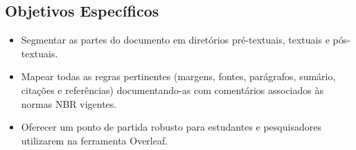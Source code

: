\subsection{Objetivos Específicos}
\begin{itemize}
  \item Segmentar as partes do documento em diretórios pré-textuais, textuais e pós-textuais.
  \item Mapear todas as regras pertinentes (margens, fontes, parágrafos, sumário, citações e referências) documentando-as com comentários associados às normas NBR vigentes.
  \item Oferecer um ponto de partida robusto para estudantes e pesquisadores utilizarem na ferramenta Overleaf.
\end{itemize}
